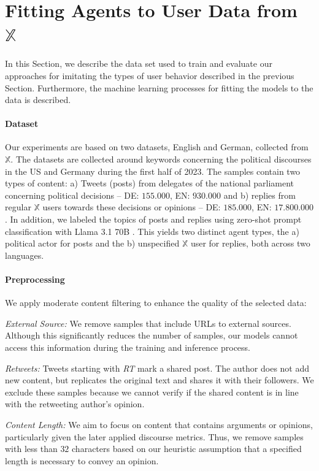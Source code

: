 \section{Fitting Agents to User Data from $\mathbb{X}$}
\label{sec:fitting}
In this Section, we describe the data set used to train and evaluate our approaches for imitating the types of user behavior described in the previous Section. Furthermore, the machine learning processes for fitting the models to the data is described.

\paragraph{Dataset}
\label{subsec:data}
Our experiments are based on two datasets, English and German, collected from $\mathbb{X}$. The datasets are collected around keywords concerning the political discourses in the US and Germany during the first half of 2023. The samples contain two types of content: a) Tweets (posts) from delegates of the national parliament concerning political decisions – DE: $155.000$, EN: $930.000$ and b) replies from regular $\mathbb{X}$ users towards these decisions or opinions – DE: $185.000$, EN: $17.800.000$. In addition, we labeled the topics of posts and replies using zero-shot prompt classification with Llama 3.1 70B \cite{zheng2023judging}. This yields two distinct agent types, the a) political actor for posts and the b) unspecified $\mathbb{X}$ user for replies, both across two languages. 

\paragraph{Preprocessing}
\label{subsec:preprocessing}
We apply moderate content filtering to enhance the quality of the selected data:

\emph{External Source:} We remove samples that include URLs to external sources. Although this significantly reduces the number of samples, our models cannot access this information during the training and inference process.

\emph{Retweets:} Tweets starting with \textit{RT} mark a shared post. The author does not add new content, but replicates the original text and shares it with their followers. We exclude these samples because we cannot verify if the shared content is in line with the retweeting author's opinion. 

\emph{Content Length:} We aim to focus on content that contains arguments or opinions, particularly given the later applied discourse metrics. Thus, we remove samples with less than $32$ characters based on our heuristic assumption that a specified length is necessary to convey an opinion.

